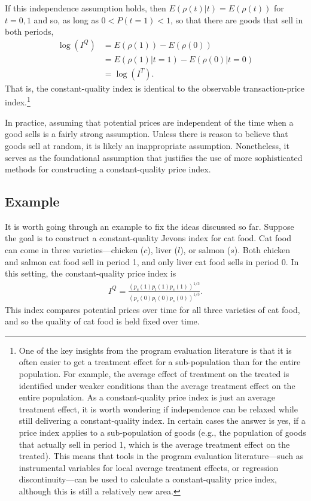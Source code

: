 \documentclass[]{article}
\begin{document}
If this independence assumption holds, then \(E(\rho(t) | t) = E(\rho(t))\) for \(t=0,1\) and so, as long as \(0 < P(t = 1) < 1\), so that there are goods that sell in both periods,
\begin{align*}
\log(I^{Q}) &= E(\rho(1)) - E(\rho(0)) \\ 
&= E(\rho(1) | t = 1) - E(\rho(0) | t = 0) \\
&= \log(I^{T}).
\end{align*}
That is, the constant-quality index is identical to the observable transaction-price index.\footnote{One of the key insights from the program evaluation literature is that it is often easier to get a treatment effect for a sub-population than for the entire population. For example, the average effect of treatment on the treated is identified under weaker conditions than the average treatment effect on the entire population. As a constant-quality price index is just an average treatment effect, it is worth wondering if independence can be relaxed while still delivering a constant-quality index. In certain cases the answer is yes, if a price index applies to a sub-population of goods (e.g., the population of goods that actually sell in period 1, which is the average treatment effect on the treated). This means that tools in the program evaluation literature---such as instrumental variables for local average treatment effects, or regression discontinuity---can be used to calculate a constant-quality price index, although this is still a relatively new area.}

In practice, assuming that potential prices are independent of the time when a good sells is a fairly strong assumption. Unless there is reason to believe that goods sell at random, it is likely an inappropriate assumption. Nonetheless, it serves as the foundational assumption that justifies the use of more sophisticated methods for constructing a constant-quality price index.

\hypertarget{example}{%
\subsection{Example}\label{example}}

It is worth going through an example to fix the ideas discussed so far. Suppose the goal is to construct a constant-quality Jevons index for cat food. Cat food can come in three varieties---chicken (\(c\)), liver (\(l\)), or salmon (\(s\)). Both chicken and salmon cat food sell in period 1, and only liver cat food sells in period 0. In this setting, the constant-quality price index is
\begin{align*}
I^{Q} = \frac{(p_{c}(1) p_{l}(1) p_{s}(1))^{1 / 3}}{(p_{c}(0) p_{l}(0) p_{s}(0))^{1 / 3}}.
\end{align*}
This index compares potential prices over time for all three varieties of cat food, and so the quality of cat food is held fixed over time.
\end{document}
